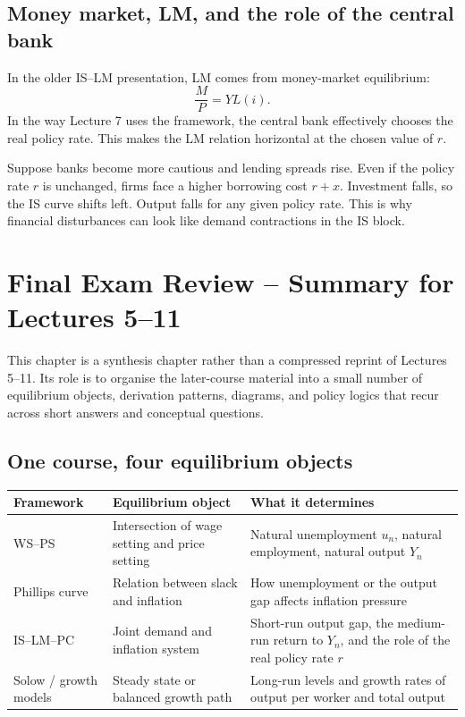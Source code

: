\documentclass[12pt]{article}
\begin{document}
\subsection{Money market, LM, and the role of the central bank}

In the older IS--LM presentation, LM comes from money-market equilibrium:
\[
\frac{M}{P}=YL(i).
\]
In the way Lecture 7 uses the framework, the central bank effectively chooses the real policy rate. This makes the LM relation horizontal at the chosen value of $r$.

\begin{examplebox}[title={Worked Example: Why a higher risk premium is contractionary}]
Suppose banks become more cautious and lending spreads rise. Even if the policy rate $r$ is unchanged, firms face a higher borrowing cost $r+x$. Investment falls, so the IS curve shifts left. Output falls for any given policy rate. This is why financial disturbances can look like demand contractions in the IS block.
\end{examplebox}


\newpage
\section{Final Exam Review -- Summary for Lectures 5--11}

This chapter is a synthesis chapter rather than a compressed reprint of Lectures 5--11. Its role is to organise the later-course material into a small number of equilibrium objects, derivation patterns, diagrams, and policy logics that recur across short answers and conceptual questions.

\subsection{One course, four equilibrium objects}

\begin{center}
\renewcommand{\arraystretch}{1.2}
\begin{tabularx}{\textwidth}{|p{2.8cm}|p{3.9cm}|X|}
\hline
\textbf{Framework} & \textbf{Equilibrium object} & \textbf{What it determines} \\
\hline
WS--PS & Intersection of wage setting and price setting & Natural unemployment \(u_n\), natural employment, natural output \(Y_n\) \\
\hline
Phillips curve & Relation between slack and inflation & How unemployment or the output gap affects inflation pressure \\
\hline
IS--LM--PC & Joint demand and inflation system & Short-run output gap, the medium-run return to \(Y_n\), and the role of the real policy rate \(r\) \\
\hline
Solow / growth models & Steady state or balanced growth path & Long-run levels and growth rates of output per worker and total output \\
\hline
\end{tabularx}
\end{center}
\end{document}
